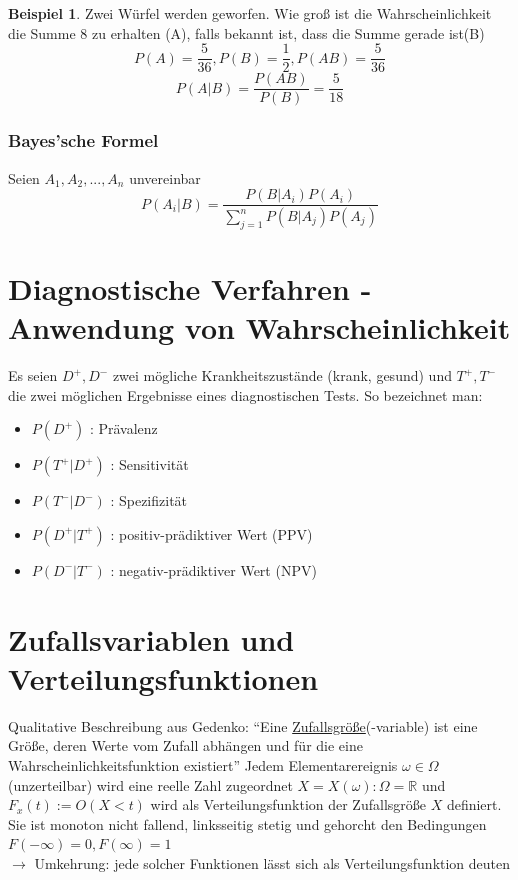 \documentclass[10pt]{report}
\theoremstyle{definition}
\newtheorem{exmp}{Beispiel}
\begin{document}
\begin{exmp}
	Zwei Würfel werden geworfen. Wie groß ist die Wahrscheinlichkeit die Summe 8 zu erhalten (A), falls bekannt ist, dass die Summe gerade ist(B)\\
	\[ P(A)=\frac{5}{36}, P(B)=\frac{1}{2}, P(AB)=\frac{5}{36} \]
	\[ P(A|B)=\frac{P(AB)}{P(B)}=\frac{5}{18} \]
\end{exmp}


\subsubsection{Bayes'sche Formel} 
Seien $A_1,A_2,...,A_n$ unvereinbar 
\[ P(A_i|B)=\frac{P(B|A_i) P(A_i)}{\sum\limits_{j=1}^n P(B|A_j) P(A_j)} \]

\section{Diagnostische Verfahren - Anwendung von Wahrscheinlichkeit}
Es seien $D^+, D^-$ zwei mögliche Krankheitszustände (krank, gesund) und $T^+,T^-$ die zwei möglichen Ergebnisse eines diagnostischen Tests.
So bezeichnet man:
\begin{itemize}
 \item $P(D^+)$ : Prävalenz
 \item $P(T^+|D^+)$ : Sensitivität
 \item $P(T^-|D^-)$ : Spezifizität
 \item $P(D^+|T^+)$ : positiv-prädiktiver Wert (PPV)
 \item $P(D^-|T^-)$ : negativ-prädiktiver Wert (NPV)
\end{itemize}

\section{Zufallsvariablen und Verteilungsfunktionen}
Qualitative Beschreibung aus Gedenko: ``Eine \underline{Zufallsgröße}(-variable) ist eine Größe, deren Werte vom Zufall abhängen und für die eine Wahrscheinlichkeitsfunktion existiert''
Jedem Elementarereignis $\omega \in \Omega$ (unzerteilbar) wird eine reelle Zahl zugeordnet $X=X(\omega) : \Omega = \mathbb{R}$ und $F_x(t):=O(X<t)$ wird als Verteilungsfunktion der Zufallsgröße $X$ definiert. Sie ist monoton nicht fallend, linksseitig stetig und gehorcht den Bedingungen $F(-\infty)=0,F(\infty)=1$ \\
$\rightarrow$ Umkehrung: jede solcher Funktionen lässt sich als Verteilungsfunktion deuten
\end{document}
